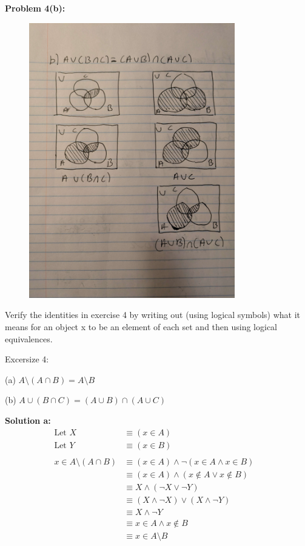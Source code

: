 \textbf{Problem 4(b):}
\begin{figure}[H]
    \centering
    \includegraphics[width=0.8\textwidth]{images/1.2/3.jpg}
\end{figure}

\begin{tcolorbox}[title=Problem 5, breakable]
Verify the identities in exercise 4 by writing out (using
logical symbols) what it means for an object x to be an element
of each set and then using logical equivalences.

Excersize 4: 

(a) $A \setminus (A \cap B) = A \setminus B$ 

(b) $A \cup (B \cap C) = (A \cup B) \cap (A \cup C)$
\end{tcolorbox}

\textbf{Solution a:}
\begin{align*}
\text{Let } X &\equiv (x \in A) \\
\text{Let } Y &\equiv (x \in B) \\ \\
x \in A \setminus (A \cap B) &\equiv (x \in A) \wedge \neg(x \in A \wedge x \in B) & \\
&\equiv (x \in A) \wedge (x \not \in A \vee x \not \in B) & \\
&\equiv X \wedge (\neg X \vee \neg Y) & \\
&\equiv (X \wedge \neg X) \vee (X \wedge \neg Y) & \\
&\equiv X \wedge \neg Y & \\
&\equiv x \in A \wedge x \not \in B & \\
&\equiv x \in A \setminus B & \\
\end{align*}

